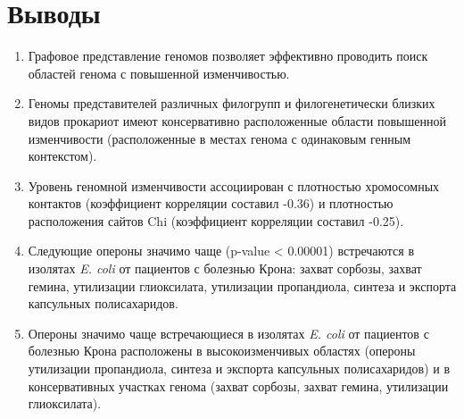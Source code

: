 \chapter{Выводы}

\begin{enumerate}
    \item Графовое представление геномов позволяет эффективно проводить поиск областей генома с повышенной изменчивостью.
  
      \item Геномы представителей различных филогрупп и филогенетически близких видов прокариот имеют консервативно расположенные области повышенной изменчивости (расположенные в местах генома с одинаковым генным контекстом).
  
       \item Уровень геномной изменчивости ассоциирован с плотностью хромосомных контактов (коэффициент корреляции составил -0.36) и плотностью расположения сайтов Chi (коэффициент корреляции составил -0.25).
  
      \item Следующие опероны значимо чаще (p-value < 0.00001) встречаются в изолятах \textit{E. coli} от пациентов с болезнью Крона: захват сорбозы, захват гемина, утилизации глиоксилата, утилизации пропандиола, синтеза и экспорта капсульных полисахаридов.
  
      \item Опероны значимо чаще встречающиеся в изолятах \textit{E. coli} от пациентов с болезнью Крона расположены в высокоизменчивых областях (опероны утилизации пропандиола, синтеза и экспорта капсульных полисахаридов) и в консервативных участках генома (захват сорбозы, захват гемина, утилизации глиоксилата).
    
    \end{enumerate}